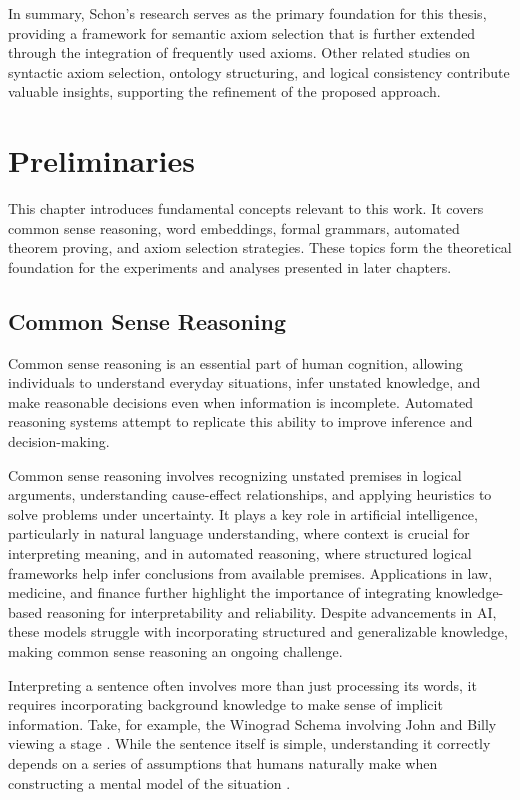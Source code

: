 \documentclass[english,version-2020-11]{uzl-thesis}
\begin{document}
In summary, Schon's research serves as the primary foundation for this thesis, providing a framework for semantic axiom selection that is further extended through the integration of frequently used axioms. Other related studies on syntactic axiom selection, ontology structuring, and logical consistency contribute valuable insights, supporting the refinement of the proposed approach.


\chapter{Preliminaries}
\label{chapter-preliminaries}

This chapter introduces fundamental concepts relevant to this work. It covers common sense reasoning, word embeddings, formal grammars, automated theorem proving, and axiom selection strategies. These topics form the theoretical foundation for the experiments and analyses presented in later chapters.

\section{Common Sense Reasoning}

Common sense reasoning is an essential part of human cognition, allowing individuals to understand everyday situations, infer unstated knowledge, and make reasonable decisions even when information is incomplete. Automated reasoning systems attempt to replicate this ability to improve inference and decision-making.

Common sense reasoning involves recognizing unstated premises in logical arguments, understanding cause-effect relationships, and applying heuristics to solve problems under uncertainty. It plays a key role in artificial intelligence, particularly in natural language understanding, where context is crucial for interpreting meaning, and in automated reasoning, where structured logical frameworks help infer conclusions from available premises. Applications in law, medicine, and finance further highlight the importance of integrating knowledge-based reasoning for interpretability and reliability. Despite advancements in AI, these models struggle with incorporating structured and generalizable knowledge, making common sense reasoning an ongoing challenge.

Interpreting a sentence often involves more than just processing its words, it requires incorporating background knowledge to make sense of implicit information. Take, for example, the Winograd Schema involving John and Billy viewing a stage \cite{Levesque2012}. While the sentence itself is simple, understanding it correctly depends on a series of assumptions that humans naturally make when constructing a mental model of the situation \cite{Bayerkuhnlein2023}.
\end{document}
